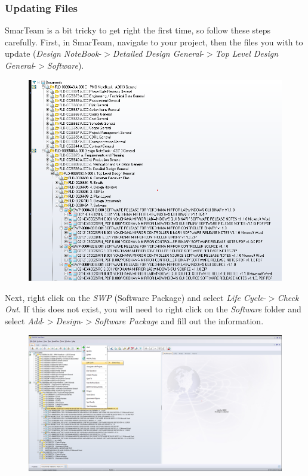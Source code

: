 \documentclass[10pt]{article}
\begin{document}
            \subsubsection{Updating Files}
                SmarTeam is a bit tricky to get right the first time, so follow these steps carefully. First, in SmarTeam, navigate to your project, then the files you with to update (\emph{Design NoteBook}-$>$\emph{Detailed Design General}-$>$\emph{Top Level Design General}-$>$\emph{Software}).
                \begin{figure}[H]
                    \centerline{\includegraphics[width=\textwidth]{References/ST Software Folder.png}}
                \end{figure}
                Next, right click on the \emph{SWP} (Software Package) and select \emph{Life Cycle}-$>$\emph{Check Out}. If this does not exist, you will need to right click on the \emph{Software} folder and select \emph{Add}-$>$\emph{Design}-$>$\emph{Software Package} and fill out the information.
                \begin{figure}[H]
                    \centerline{\includegraphics[width=\textwidth]{References/ST Check Out.png}}
                \end{figure}
\end{document}
